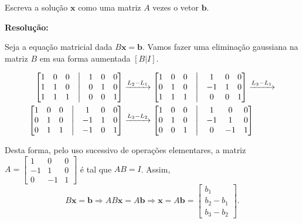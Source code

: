 \documentclass[leqno]{article}
\begin{document}
\begin{enumerate}
    Escreva a solução $\textbf{x}$ como uma matriz $A$ vezes o vetor $\textbf{b}$.
    
    \textbf{Resolução:}
    
    Seja a equação matricial dada $B\textbf{x}=\textbf{b}$. Vamos fazer uma eliminação gaussiana na matriz $B$ em sua forma aumentada $[B|I]$.
    
    \begin{align*}
    \begin{bmatrix}
    1 & 0 & 0 & \bigm| & 1 & 0 & 0\\
    1 & 1 & 0 & \bigm| & 0 & 1 & 0\\
    1 & 1 & 1 & \bigm| & 0 & 0 & 1\\
    \end{bmatrix}&\xrightarrow{L_2-L_1}\begin{bmatrix}
    1 & 0 & 0 & \bigm| & 1 & 0 & 0\\
    0 & 1 & 0 & \bigm| & -1 & 1 & 0\\
    1 & 1 & 1 & \bigm| & 0 & 0 & 1\\
    \end{bmatrix}\xrightarrow{L_3-L_1}\\
    \begin{bmatrix}
    1 & 0 & 0 & \bigm| & 1 & 0 & 0\\
    0 & 1 & 0 & \bigm| & -1 & 1 & 0\\
    0 & 1 & 1 & \bigm| & -1 & 0 & 1\\
    \end{bmatrix}&\xrightarrow{L_3-L_2}\begin{bmatrix}
    1 & 0 & 0 & \bigm| & 1 & 0 & 0\\
    0 & 1 & 0 & \bigm| & -1 & 1 & 0\\
    0 & 0 & 1 & \bigm| & 0 & -1 & 1\\
    \end{bmatrix}\\
    \end{align*}
    
    Desta forma, pelo uso sucessivo de operações elementares, a matriz $A=\begin{bmatrix}
    1 & 0 & 0\\
    -1 & 1 & 0\\
    0 & -1 & 1
    \end{bmatrix}$ é tal que $AB=I$. Assim,
    $$B\textbf{x}=\textbf{b}\Rightarrow AB\textbf{x}=A\textbf{b}\Rightarrow\textbf{x}=A\textbf{b}=\begin{bmatrix}
    b_1\\
    b_2-b_1\\
    b_3-b_2
    \end{bmatrix}\text{.}$$
    

\end{enumerate}
\end{document}
